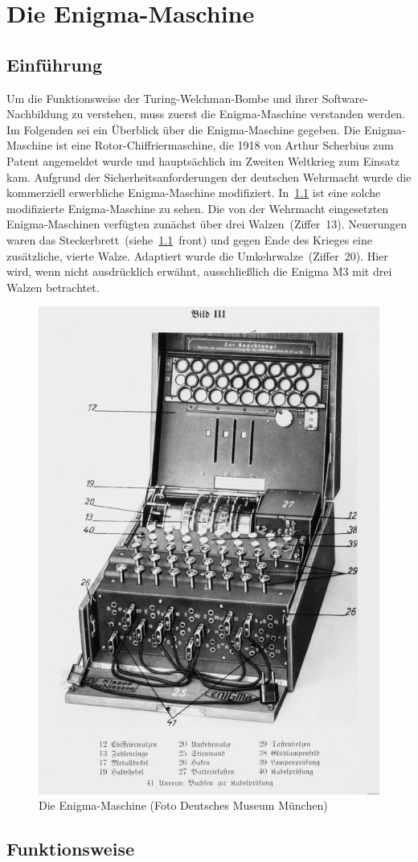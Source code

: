 \chapter{Die Enigma-Maschine}\label{ch:die-enigma}
\section{Einführung}\label{sec:einfuhrung}

Um die Funktionsweise der Turing-Welchman-Bombe und ihrer Software-Nach\-bil\-dung zu verstehen, muss zuerst die Enigma-Maschine verstanden werden.
Im Folgenden sei ein Überblick über die Enigma-Maschine gegeben.
Die Enigma-Maschine ist eine Rotor-Chiffrier\-maschine, die 1918 von Arthur Scherbius zum Patent angemeldet wurde und hauptsächlich im Zweiten Weltkrieg zum Einsatz kam.
Aufgrund der Sicherheitsanforderungen der deutschen Wehrmacht wurde die kommerziell erwerbliche Enigma-Maschine modifiziert.
In~\cref{fig:enigma_complete} ist eine solche modifizierte Enigma-Maschine zu sehen.
Die von der Wehrmacht eingesetzten Enigma-Maschinen verfügten zunächst über drei Walzen~(Ziffer~13).
Neuerungen waren das Steckerbrett~(siehe~\cref{fig:enigma_complete}~front) und gegen Ende des Krieges eine zusätzliche, vierte Walze. 
Adaptiert wurde die Umkehrwalze~(Ziffer~20).
Hier wird, wenn nicht ausdrücklich erwähnt, ausschließlich die Enigma M3 mit drei Walzen betrachtet.
\vspace*{-2pt}
\begin{figure}[H]
	\centering
	\includegraphics[width=.39\linewidth]{Enigma/Enigma-plakat}
	\caption{Die Enigma-Maschine (Foto Deutsches Museum München)}
	\label{fig:enigma_complete}
\end{figure}
\vspace{-1em}

\section{Funktionsweise}\label{sec:funktionsweise}

